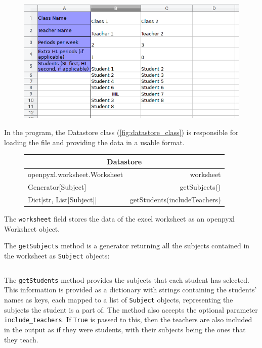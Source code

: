 \documentclass[12pt]{article}
\newcommand{\code}[1]{\texttt{\color{Grey}#1}}
\begin{document}
\begin{figure}[H]
    \caption{}
    \includegraphics[width=\textwidth]{data_file_structure.png}
    \label{fig:data_file_structure}
\end{figure}

In the program, the Datastore class (\autoref{fig:datastore_class}) is responsible for loading
the file and providing the data in a usable format.
%
\begin{figure}[H]
    \caption{}
    \label{fig:datastore_class}
    \centering
    \def\arraystretch{1.5}
    \begin{tabular}{|l r|}
        \hline
        \multicolumn{2}{|c|}{Datastore}\\
        \hline
        \hline
        openpyxl.worksheet.Worksheet &worksheet\\
        \hline
        Generator[Subject] &getSubjects()\\
        Dict[str, List[Subject]] &getStudents(includeTeachers)\\
        \hline
    \end{tabular}
    \label{table:datastore}
\end{figure}
%
The \code{worksheet} field stores the data of the excel worksheet as an openpyxl Worksheet
object. 

The \code{getSubjects} method is a generator returning all the subjects contained in the
worksheet as \code{Subject} objects:
\vspace{-3mm}
\begin{figure}[H]
    \caption{}
    \inputminted{python}{datastore_get_subjects.py}
    \label{fig:get_subjects}
\end{figure}

The \code{getStudents} method provides the subjects that each student has selected. This
information is provided as a dictionary with strings containing the students' names as keys,
each mapped to a list of \code{Subject} objects, representing the subjects the student is a
part of. The method also accepts the optional parameter \code{include\_teachers}. If
\code{True} is passed to this, then the teachers are also included in the output as if they
were students, with their subjects being the ones that they teach.
\vspace{-3mm}
\begin{figure}[H]
    \caption{}
    \inputminted{python}{datastore_get_students.py}
    \label{fig:get_students}
\end{figure}
\end{document}
